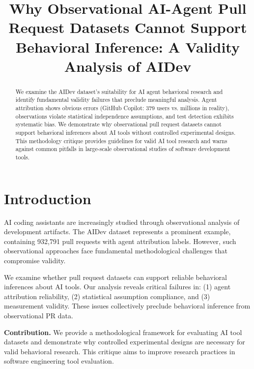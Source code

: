\documentclass[conference]{IEEEtran}
\begin{document}
\title{Why Observational AI-Agent Pull Request Datasets Cannot Support Behavioral Inference: A Validity Analysis of AIDev}

\author{
}

\maketitle

\begin{abstract}
We examine the AIDev dataset's suitability for AI agent behavioral research and identify fundamental validity failures that preclude meaningful analysis. Agent attribution shows obvious errors (GitHub Copilot: 379 users vs. millions in reality), observations violate statistical independence assumptions, and test detection exhibits systematic bias. We demonstrate why observational pull request datasets cannot support behavioral inferences about AI tools without controlled experimental designs. This methodology critique provides guidelines for valid AI tool research and warns against common pitfalls in large-scale observational studies of software development tools.
\end{abstract}

\section{Introduction}
AI coding assistants are increasingly studied through observational analysis of development artifacts. The AIDev dataset represents a prominent example, containing 932,791 pull requests with agent attribution labels. However, such observational approaches face fundamental methodological challenges that compromise validity.

We examine whether pull request datasets can support reliable behavioral inferences about AI tools. Our analysis reveals critical failures in: (1) agent attribution reliability, (2) statistical assumption compliance, and (3) measurement validity. These issues collectively preclude behavioral inference from observational PR data.

\textbf{Contribution.} We provide a methodological framework for evaluating AI tool datasets and demonstrate why controlled experimental designs are necessary for valid behavioral research. This critique aims to improve research practices in software engineering tool evaluation.
\end{document}
